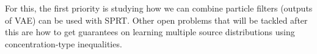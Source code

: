 \documentclass[english]{article}
\numberwithin{equation}{section}
\begin{document}
	For this, the first priority is studying how we can combine particle filters (outputs of VAE) can be used with SPRT. Other open problems that will be tackled after this are how to get guarantees on learning multiple source distributions using concentration-type inequalities.
\end{document}
